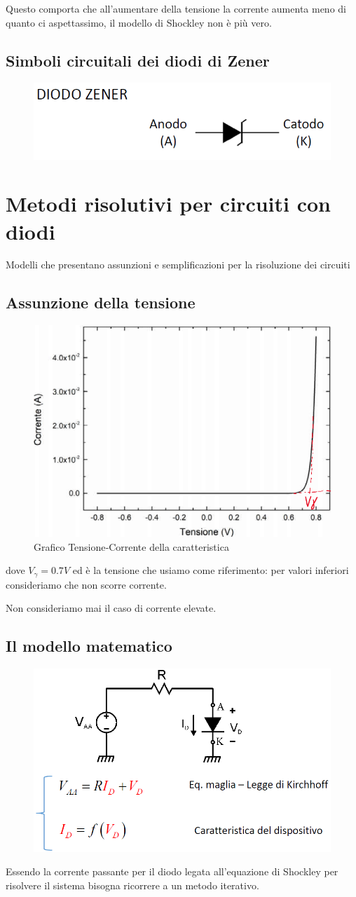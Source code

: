 \documentclass[11pt,a4paper,]{article}
\begin{document}
Questo comporta che all'aumentare della tensione la corrente aumenta meno di quanto ci aspettassimo, il modello di Shockley non è più vero.
\subsection{Simboli circuitali dei diodi di Zener}
\begin{figure}[H]
    \centering
    \includegraphics[width=0.5\linewidth]{img/diodo z.png}
\end{figure}

\section{Metodi risolutivi per circuiti con diodi}
Modelli che presentano assunzioni e semplificazioni per la risoluzione dei circuiti
\subsection{Assunzione della tensione}
\begin{figure}[H]
    \centering
    \includegraphics[width=0.5\linewidth]{img/tens corr caratt.png}
    \caption{Grafico Tensione‑Corrente della caratteristica}
\end{figure}
dove $V_\gamma = 0.7V$ ed è la tensione che usiamo come riferimento: per valori inferiori consideriamo che non scorre corrente.
\begin{nota}
    Non consideriamo mai il caso di corrente elevate.
\end{nota}
\subsection{Il modello matematico}
\begin{figure}[H]
    \centering
    \includegraphics[width=0.38\linewidth]{img/circ es mod mat.png}
\end{figure}
Essendo la corrente passante per il diodo legata all'equazione di Shockley per risolvere il sistema bisogna ricorrere a un metodo iterativo.
\end{document}
